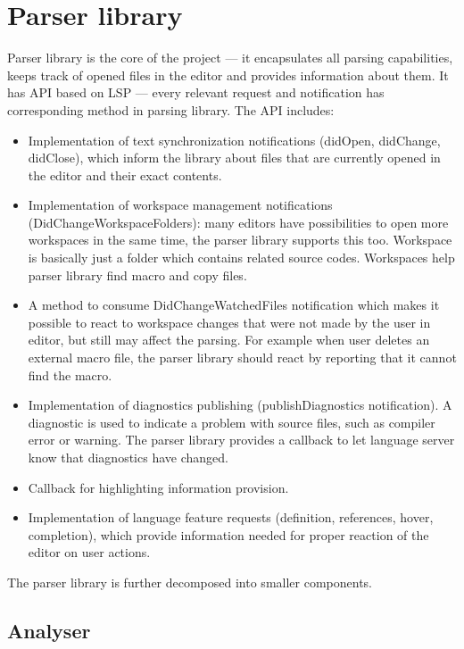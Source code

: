 \section{Parser library}

Parser library is the core of the project --- it encapsulates all parsing capabilities, keeps track of opened files in the editor and provides information about them. It has API based on LSP --- every relevant request and notification has corresponding method in parsing library. The API includes:

\begin{itemize}
	\item Implementation of text synchronization notifications (didOpen, didChange, didClose), which inform the library about files that are currently opened in the editor and their exact contents.
	\item Implementation of workspace management notifications (DidChangeWorkspaceFolders): many editors have possibilities to open more workspaces in the same time, the parser library supports this too. Workspace is basically just a folder which contains related source codes. Workspaces help parser library find macro and copy files.
	\item A method to consume DidChangeWatchedFiles notification which makes it possible to react to workspace changes that were not made by the user in editor, but still may affect the parsing. For example when user deletes an external macro file, the parser library should react by reporting that it cannot find the macro.
	\item Implementation of diagnostics publishing (publishDiagnostics notification). A diagnostic is used to indicate a problem with source files, such as compiler error or warning. The parser library provides a callback to let language server know that diagnostics have changed.
	\item Callback for highlighting information provision.
	\item Implementation of language feature requests (definition, references, hover, completion), which provide information needed for proper reaction of the editor on user actions.
	
\end{itemize}

The parser library is further decomposed into smaller components.

\subsection{Analyser}

